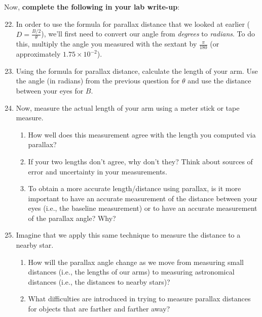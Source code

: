 \documentclass[11pt]{article}
\begin{document}
Now, \textbf{complete the following in your lab write-up}:
\begin{enumerate}
\setcounter{enumi}{21}
    \item In order to use the formula for parallax distance that we looked at earlier ($D = \frac{B/2}{\theta}$), we'll first need to convert our angle from \emph{degrees} to \emph{radians}. To do this, multiply the angle you measured with the sextant by $\frac{\pi}{180}$ (or approximately $1.75 \times 10^{-2}$).
    
    \item Using the formula for parallax distance, calculate the length of your arm. Use the angle (in radians) from the previous question for $\theta$ and use the distance between your eyes for $B$.
    
    \item Now, measure the actual length of your arm using a meter stick or tape measure.
    \begin{enumerate}
        \item How well does this measurement agree with the length you computed via parallax?
        
        \item If your two lengths don't agree, why don't they? Think about sources of error and uncertainty in your measurements.
        
        \item To obtain a more accurate length/distance using parallax, is it more important to have an accurate measurement of the distance between your eyes (i.e., the baseline measurement) or to have an accurate measurement of the parallax angle? Why?
    \end{enumerate}
    
    \item Imagine that we apply this same technique to measure the distance to a nearby star.
    \begin{enumerate}
        \item How will the parallax angle change as we move from measuring small distances (i.e., the lengths of our arms) to measuring astronomical distances (i.e., the distances to nearby stars)?
        
        \item What difficulties are introduced in trying to measure parallax distances for objects that are farther and farther away? 
    \end{enumerate}
        
\end{enumerate}
\end{document}

